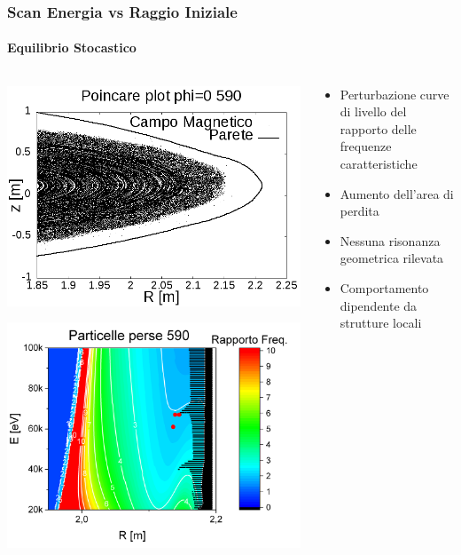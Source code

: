 \begin{frame}
\frametitle{Scan Energia vs Raggio Iniziale}
\framesubtitle{Equilibrio Stocastico}
\begin{columns}
	\begin{column}{0.4\textwidth}
		\begin{center}
		\includegraphics[scale=0.18]{Immagini/Simulazioni/Poincare/poincare_590.png}
		\end{center}
		\begin{center}
		\includegraphics[scale=0.20]{Immagini/Simulazioni/Risonanze/particle_losses_590.png}
		\end{center}
	\end{column}
	\begin{column}{0.4\textwidth}
		\begin{itemize}
			\item Perturbazione curve di livello del rapporto delle frequenze caratteristiche
			\item Aumento dell'area di perdita
			\item Nessuna risonanza geometrica rilevata
			\item Comportamento dipendente da strutture locali
		\end{itemize}
	\end{column}
\end{columns}
\end{frame}

